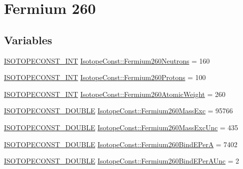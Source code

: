 \hypertarget{group___isotope_const-_fermium-_fm260}{}\section{Fermium 260}
\label{group___isotope_const-_fermium-_fm260}
\subsection*{Variables}
\begin{DoxyCompactItemize}
\item 
\mbox{\hyperlink{group___isotope_const-_macros_ga5f18360b3e99483a35c32d789e62621c}{I\+S\+O\+T\+O\+P\+E\+C\+O\+N\+S\+T\+\_\+\+I\+NT}} \mbox{\hyperlink{group___isotope_const-_fermium-_fm260_ga226dda4dee409370b26778281edde275}{Isotope\+Const\+::\+Fermium260\+Neutrons}} = 160
\item 
\mbox{\hyperlink{group___isotope_const-_macros_ga5f18360b3e99483a35c32d789e62621c}{I\+S\+O\+T\+O\+P\+E\+C\+O\+N\+S\+T\+\_\+\+I\+NT}} \mbox{\hyperlink{group___isotope_const-_fermium-_fm260_gab49515433ee6e54571ae215448f92300}{Isotope\+Const\+::\+Fermium260\+Protons}} = 100
\item 
\mbox{\hyperlink{group___isotope_const-_macros_ga5f18360b3e99483a35c32d789e62621c}{I\+S\+O\+T\+O\+P\+E\+C\+O\+N\+S\+T\+\_\+\+I\+NT}} \mbox{\hyperlink{group___isotope_const-_fermium-_fm260_ga1867e2e657609789387e9d1523959737}{Isotope\+Const\+::\+Fermium260\+Atomic\+Weight}} = 260
\item 
\mbox{\hyperlink{group___isotope_const-_macros_ga8f45a7272ce02c0b4c65c44636ed719a}{I\+S\+O\+T\+O\+P\+E\+C\+O\+N\+S\+T\+\_\+\+D\+O\+U\+B\+LE}} \mbox{\hyperlink{group___isotope_const-_fermium-_fm260_gaba4dfde1488e2b24f38997b37f0abb83}{Isotope\+Const\+::\+Fermium260\+Mass\+Exc}} = 95766
\item 
\mbox{\hyperlink{group___isotope_const-_macros_ga8f45a7272ce02c0b4c65c44636ed719a}{I\+S\+O\+T\+O\+P\+E\+C\+O\+N\+S\+T\+\_\+\+D\+O\+U\+B\+LE}} \mbox{\hyperlink{group___isotope_const-_fermium-_fm260_ga45657d253710a917d18907cbf2ac8dfe}{Isotope\+Const\+::\+Fermium260\+Mass\+Exc\+Unc}} = 435
\item 
\mbox{\hyperlink{group___isotope_const-_macros_ga8f45a7272ce02c0b4c65c44636ed719a}{I\+S\+O\+T\+O\+P\+E\+C\+O\+N\+S\+T\+\_\+\+D\+O\+U\+B\+LE}} \mbox{\hyperlink{group___isotope_const-_fermium-_fm260_ga7b01b5538e9e0c7c071073ff738284d2}{Isotope\+Const\+::\+Fermium260\+Bind\+E\+PerA}} = 7402
\item 
\mbox{\hyperlink{group___isotope_const-_macros_ga8f45a7272ce02c0b4c65c44636ed719a}{I\+S\+O\+T\+O\+P\+E\+C\+O\+N\+S\+T\+\_\+\+D\+O\+U\+B\+LE}} \mbox{\hyperlink{group___isotope_const-_fermium-_fm260_gad099189298271fe66a93fbda7613497e}{Isotope\+Const\+::\+Fermium260\+Bind\+E\+Per\+A\+Unc}} = 2

\end{DoxyCompactItemize}
